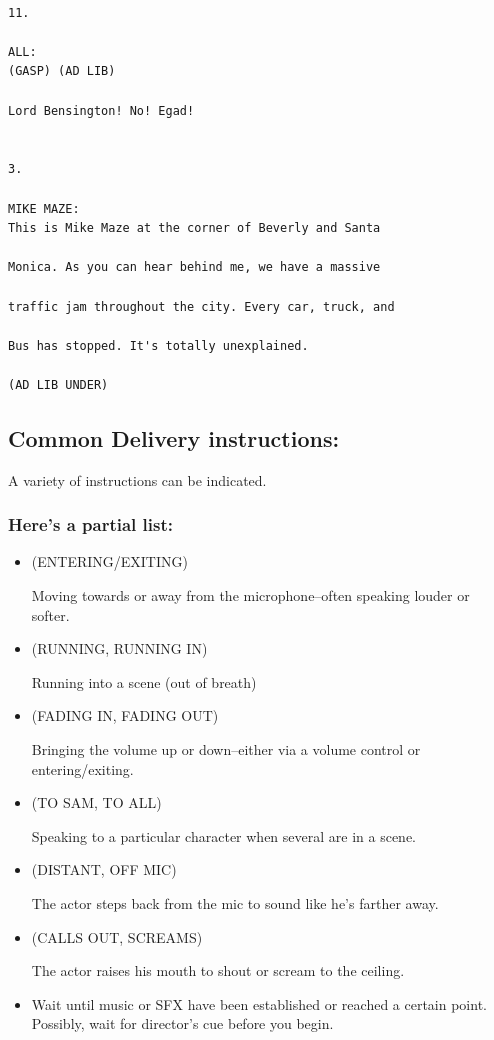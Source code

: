 \documentclass[openleft,oneside,showtrims]{memoir}
\begin{document}
\lstset{language=fountain,label= ,caption= ,captionpos=b,numbers=none}
\begin{lstlisting}

11.

ALL:
(GASP) (AD LIB)
  
Lord Bensington! No! Egad!


3.

MIKE MAZE:
This is Mike Maze at the corner of Beverly and Santa
  
Monica. As you can hear behind me, we have a massive 
  
traffic jam throughout the city. Every car, truck, and 
  
Bus has stopped. It's totally unexplained.
  
(AD LIB UNDER)

\end{lstlisting}
\subsection{Common Delivery instructions:}
\label{sec:orga48fc91}
A variety of instructions can be indicated.

\subsubsection*{Here's a partial list:}
\label{sec:org0937a4e}

\begin{itemize}
\item (ENTERING/EXITING)
\label{sec:orgcdf9a52}

Moving towards or away from the microphone--often speaking louder or softer.

\item (RUNNING, RUNNING IN)
\label{sec:org7a426f8}

Running into a scene (out of breath)

\item (FADING IN, FADING OUT)
\label{sec:org92a824b}

Bringing the volume up or down--either via a volume control or entering/exiting.

\item (TO SAM, TO ALL)
\label{sec:orga2faf83}

Speaking to a particular character when several are in a scene.

\item (DISTANT, OFF MIC)
\label{sec:org07c8e50}

The actor steps back from the mic to sound like he's farther away.

\item (CALLS OUT, SCREAMS)
\label{sec:org43cd613}

The actor raises his mouth to shout or scream to the ceiling.

\item\relax [CUE]
\label{sec:org5cc3d9f}

Wait until music or SFX have been established or reached a certain point. Possibly, wait for director's cue before you begin.
\end{itemize}
\end{document}
